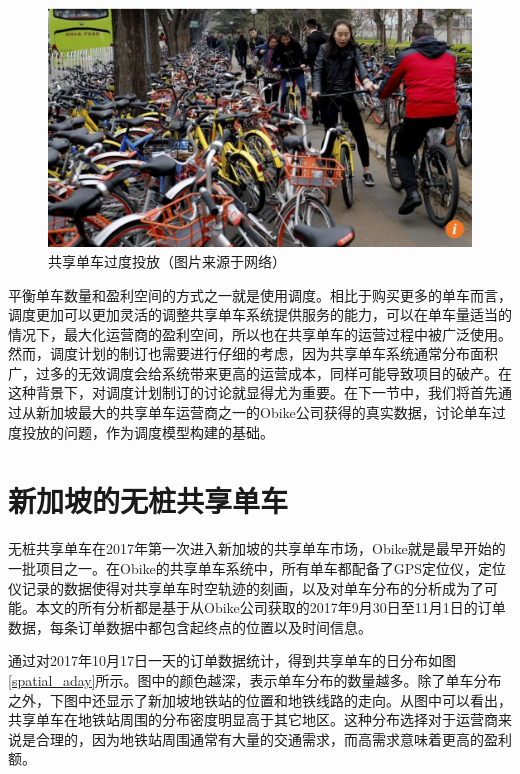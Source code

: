 \documentclass[]{tongjithesis}
\numberwithin{equation}{chapter}
\begin{document}
\begin{figure}[H]
	\centering
	\includegraphics[width= 0.7 \textwidth]{figures_main/waste1.jpg}
	\caption{共享单车过度投放（图片来源于网络）}
	\label{waste2}
\end{figure}

平衡单车数量和盈利空间的方式之一就是使用调度。相比于购买更多的单车而言，调度更加可以更加灵活的调整共享单车系统提供服务的能力，可以在单车量适当的情况下，最大化运营商的盈利空间，所以也在共享单车的运营过程中被广泛使用。然而，调度计划的制订也需要进行仔细的考虑，因为共享单车系统通常分布面积广，过多的无效调度会给系统带来更高的运营成本，同样可能导致项目的破产。在这种背景下，对调度计划制订的讨论就显得尤为重要。在下一节中，我们将首先通过从新加坡最大的共享单车运营商之一的Obike公司获得的真实数据，讨论单车过度投放的问题，作为调度模型构建的基础。

\section{新加坡的无桩共享单车}
无桩共享单车在2017年第一次进入新加坡的共享单车市场，Obike就是最早开始的一批项目之一。在Obike的共享单车系统中，所有单车都配备了GPS定位仪，定位仪记录的数据使得对共享单车时空轨迹的刻画，以及对单车分布的分析成为了可能。本文的所有分析都是基于从Obike公司获取的2017年9月30日至11月1日的订单数据，每条订单数据中都包含起终点的位置以及时间信息。

通过对2017年10月17日一天的订单数据统计，得到共享单车的日分布如图\ref{spatial_aday}所示。图中的颜色越深，表示单车分布的数量越多。除了单车分布之外，下图中还显示了新加坡地铁站的位置和地铁线路的走向。从图中可以看出，共享单车在地铁站周围的分布密度明显高于其它地区。这种分布选择对于运营商来说是合理的，因为地铁站周围通常有大量的交通需求，而高需求意味着更高的盈利额。
\end{document}
